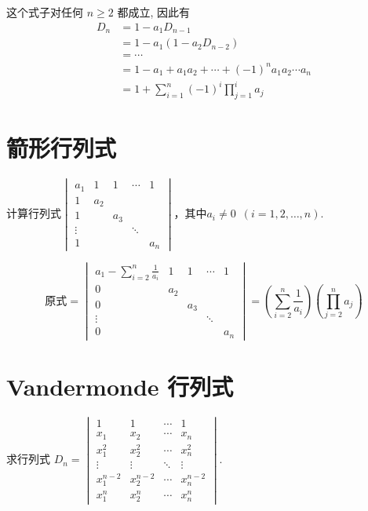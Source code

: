 \begin{solution}
    这个式子对任何 $n \geq 2$ 都成立, 因此有
    \begin{align*}
        D_n &=1-a_{1} D_{n-1} \\
        &=1-a_{1}(1-a_{2} D_{n-2}) \\
        &=\cdots \\
        &=1-a_{1}+a_{1} a_{2}+\cdots+(-1)^n a_{1} a_{2} \cdots a_n \\
        &=1+\sum_{i=1}^{n}(-1)^i \prod_{j=1}^i a_j
    \end{align*}
\end{solution}

\section{箭形行列式}

\begin{example}
    计算行列式$\begin{vmatrix}
        a_1 &1&1&\cdots&1\\
        1&a_2\\
        1&&a_3\\
        \vdots&&&\ddots\\
        1&&&&a_n
    \end{vmatrix}$，其中$a_i\neq 0\enspace(i=1,2,\ldots,n)$.
\end{example}

\begin{solution}
    \[ \text{原式}=\begin{vmatrix}
    a_1-\displaystyle\sum_{i=2}^n\frac{1}{a_i} &1&1&\cdots&1\\
    0&a_2\\
    0&&a_3\\
    \vdots&&&\ddots\\
    0&&&&a_n
    \end{vmatrix}
    =\left(\sum_{i=2}^n\frac{1}{a_i}\right)
    \left(\prod_{j=2}^na_j\right) \]
\end{solution}

\section{Vandermonde 行列式}

\begin{example}
    求行列式 $D_n=\begin{vmatrix}
        1 & 1 & \cdots & 1 \\
        x_1 & x_2 & \cdots & x_n \\
        x_1^{2} & x_2^{2} & \cdots & x_n^{2} \\
        \vdots & \vdots & \ddots & \vdots \\
        x_1^{n-2} & x_2^{n-2} & \cdots & x_n^{n-2} \\
        x_1^{n} & x_2^{n} & \cdots & x_n^{n}
    \end{vmatrix}$.
\end{example}

